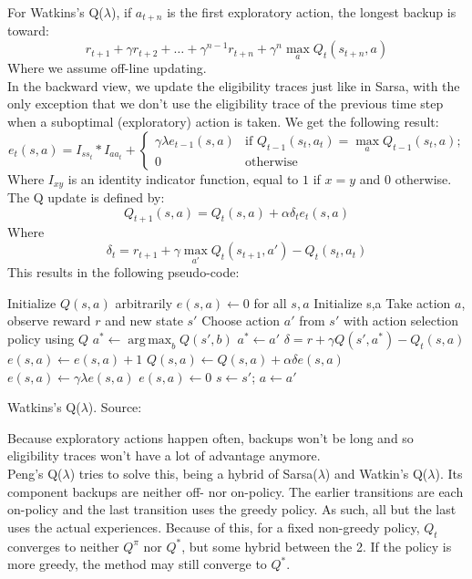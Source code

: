\documentclass[a4paper]{article}
\DeclareMathOperator*{\argmax}{arg\,max}
\begin{document}
For Watkins's Q($\lambda$), if $a_{t+n}$ is the first exploratory action, the longest backup is toward:
\begin{equation}
r_{t+1} + \gamma r_{t+2} + \dots + \gamma^{n-1} r_{t+n} + \gamma^n \max_a Q_t(s_{t+n},a)
\end{equation}
Where we assume off-line updating.\\
In the backward view, we update the eligibility traces just like in Sarsa, with the only exception that we don't use the eligibility trace of the previous time step when a suboptimal (exploratory) action is taken. We get the following result:
\begin{equation}
e_t(s,a) = I_{s s_t} * I_{a a_t} + \begin{cases}
	\gamma \lambda e_{t-1}(s,a) & \text{if $Q_{t-1}(s_t,a_t) = \max_a Q_{t-1}(s_t,a)$;} \\
    0 & \text{otherwise}
\end{cases}
\end{equation}
Where $I_{xy}$ is an identity indicator function, equal to $1$ if $x=y$ and $0$ otherwise. The Q update is defined by:
\begin{equation}
Q_{t+1}(s,a) = Q_t(s,a) + \alpha \delta_t e_t(s,a)
\end{equation}
Where
\begin{equation}
\delta_t = r_{t+1} + \gamma \max_{a'} Q_t(s_{t+1}, a') - Q_t(s_t,a_t)
\end{equation}
This results in the following pseudo-code:\\
\begin{algorithm}[H]
\DontPrintSemicolon
Initialize $Q(s,a)$ arbitrarily\;
$e(s,a) \gets 0$ for all $s,a$\;
 {
	Initialize s,a\;
	 {
    	Take action $a$, observe reward $r$ and new state $s'$\;
        Choose action $a'$ from $s'$ with action selection policy using $Q$\;
        $a^* \gets \argmax_b Q(s',b)$\;
         {
        	$a^* \gets a'$\;
        }
        $\delta = r + \gamma Q(s',a^*) - Q_t(s,a)$\;
        $e(s,a) \gets e(s,a) + 1$\;
         {
        	$Q(s,a) \gets Q(s,a) + \alpha \delta e(s,a)$\;
             {
            	$e(s,a) \gets \gamma \lambda e(s,a)$\;
            }{
            	$e(s,a) \gets 0$\;
            }
        }
        $s \gets s'$; $a \gets a'$\;
    }
}
\caption{Watkins's Q($\lambda$). Source: \cite{Sutton1998ReinforcementIntroduction}}
\end{algorithm}
Because exploratory actions happen often, backups won't be long and so eligibility traces won't have a lot of advantage anymore.\\
Peng's Q($\lambda$) tries to solve this, being a hybrid of Sarsa($\lambda$) and Watkin's Q($\lambda$). Its component backups are neither off- nor on-policy. The earlier transitions are each on-policy and the last transition uses the greedy policy. As such, all but the last uses the actual experiences. Because of this, for a fixed non-greedy policy, $Q_t$ converges to neither $Q^{\pi}$ nor $Q^{*}$, but some hybrid between the 2. If the policy is more greedy, the method may still converge to $Q^{*}$.\\
\end{document}
